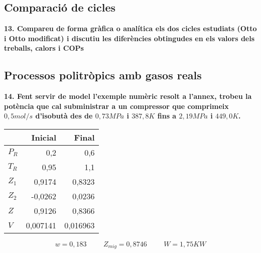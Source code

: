 \documentclass[a4paper]{article}
\begin{document}
\subsection*{Comparació de cicles}	

\textbf{13. Compareu de forma gràfica o analítica els dos cicles estudiats (Otto i Otto modificat) i discutiu les diferències obtingudes en els valors dels treballs, calors i COPs}

\subsection*{Processos politròpics amb gasos reals}

\textbf{14. Fent servir de model l’exemple numèric resolt a l’annex, trobeu la potència que cal subministrar a un compressor que comprimeix $0,5 mol/s$ d’isobutà des de $0,73 MPa$ i $387,8 K$ fins a $2,19 MPa$ i $449,0 K$.}

\begin{center}
	\begin{tabular}{l|rr}
		& Inicial & Final \\
		\hline
		$P_R$ & 0,2 & 0,6 \\
		$T_R$ & 0,95 & 1,1 \\
		$Z_1$ & 0,9174 & 0,8323 \\
		$Z_2$ & -0,0262 & 0,0236 \\
		$Z$ & 0,9126 & 0,8366 \\
		$V$ & 0,007141 & 0,016963 \\
	\end{tabular}
\end{center}

$$ w = 0,183 \hspace{1cm} Z_{mig} = 0,8746 \hspace{1cm} W = 1,75KW $$
\end{document}
